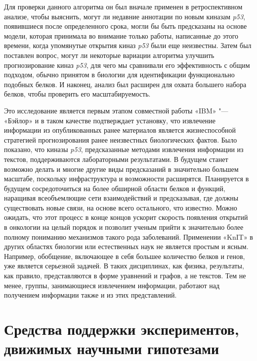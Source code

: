 Для проверки данного алгоритма он был вначале применен в ретроспективном анализе, чтобы выяснить, могут ли недавние 
аннотации по новым киназам \textit{p53}, появившиеся после определенного срока, могли бы быть предсказаны на основе 
модели, которая принимала во внимание только работы, написанные до этого времени, когда упомянутые открытия киназ 
\textit{p53} были еще неизвестны. Затем был поставлен вопрос, могут ли некоторые вариации алгоритма улучшить 
прогнозирование киназ \textit{p53}, для чего мы сравнивали его эффективность с общим подходом, обычно принятом в 
биологии для идентификации функционально подобных белков. И наконец, анализ был расширен для охвата большего набора 
белков, чтобы проверить его масштабируемость.

Это исследование является первым этапом совместной работы «IBM» "--- «Бэйлор» и в таком качестве подтверждает 
установку, что извлечение информации из опубликованных ранее материалов является жизнеспособной стратегией 
прогнозирования ранее неизвестных биологических фактов. Было показано, что киназы \textit{p53}, предсказанные методами 
извлечения информации из текстов, поддерживаются лабораторными результатами. В будущем станет возможно делать и многие 
другие виды предсказаний в значительно большем масштабе, поскольку инфраструктура и возможности расширятся. Планируется 
в будущем сосредоточиться на более обширной области белков и функций, наращивая всеобъемлющие сети взаимодействий и 
предсказывая, где должны существовать новые связи, на основе всего остального, что известно. Можно ожидать, что этот 
процесс в конце концов ускорит скорость появления открытий в онкологии на целый порядок и позволит ученым прийти к 
значительно более полному пониманию механизмов такого рода заболеваний. Применении «KnIT» в других областях биологии 
или естественных наук не является простым и ясным. Например, обобщение, включающее в себя большее количество белков и 
генов, уже является серьезной задачей. В таких дисциплинах, как физика, результаты, как правило, представляются в форме 
уравнений и графов, а не текстов. Тем не менее, группы, занимающиеся извлечением информации, работают над получением 
информации также и из этих представлений.


\section{Средства поддержки экспериментов, движимых научными гипотезами}\label{sect1_3}

